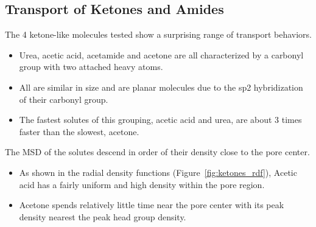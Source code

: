 \documentclass{article}
\begin{document}
  
  

  \subsection*{Transport of Ketones and Amides}
  
  The 4 ketone-like molecules tested show a surprising range of transport behaviors.
  \begin{itemize}
    \item Urea, acetic acid, acetamide and acetone are all characterized by a carbonyl group
    with two attached heavy atoms. 
    \item All are similar in size and are planar molecules due to the sp2 hybridization of
    their carbonyl group.
    \item The fastest solutes of this grouping, acetic acid and urea, are about
    3 times faster than the slowest, acetone. %
  \end{itemize}
  
  \noindent The MSD of the solutes descend in order of their density close to the pore center.
  \begin{itemize}
    \item As shown in the radial density functions (Figure~\ref{fig:ketones_rdf}), 
    Acetic acid has a fairly uniform and high density within the pore region.
    \item Acetone spends relatively little time near the pore center with its
    peak density nearest the peak head group density.
  \end{itemize}
  
\end{document}
